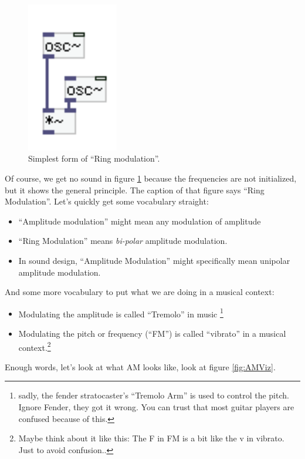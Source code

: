 \begin{figure}[H]
	\begin{center}
		\includegraphics[width = 4cm]{img/ringNaive.png}
		\caption{Simplest form of ``Ring modulation''.}
		\label{fig:simpleAM}
	\end{center}
\end{figure}
Of course, we get no sound in figure \ref{fig:simpleAM} because the frequencies are not initialized, but it shows the general principle. The caption of that figure says ``Ring Modulation''. Let's quickly get some vocabulary straight:\\
\begin{itemize}
	\item ``Amplitude modulation'' might mean any modulation of amplitude
	\item ``Ring Modulation'' means \textit{bi-polar} amplitude modulation.
	\item In sound design, ``Amplitude Modulation'' might specifically mean unipolar amplitude modulation.
\end{itemize}

And some more vocabulary to put what we are doing in a musical context:
\begin{itemize}
	\item Modulating the amplitude is called ``Tremolo'' in music \footnote{sadly, the fender stratocaster's ``Tremolo Arm'' is used to control the pitch. Ignore Fender, they got it wrong. You can trust that most guitar players are confused because of this.}
	\item Modulating the pitch or frequency (``FM'') is called ``vibrato'' in a musical context.\footnote{Maybe think about it like this: The F in FM is a bit like the v in vibrato. Just to avoid confusion..}
\end{itemize}

Enough words, let's look at what AM looks like, look at figure \ref{fig:AMViz}.

